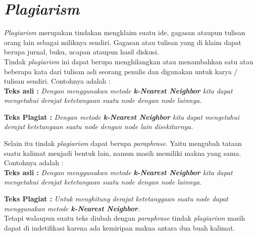 \documentclass[../Proposal.tex]{subfiles}
\begin{document}
	\section{\textit{Plagiarism}}
	\textit{Plagiarism} merupakan tindakan mengklaim suatu ide, gagasan ataupun tulisan orang lain sebagai miliknya sendiri. Gagasan atau tulisan yang di klaim dapat berupa jurnal, buku, ucapan ataupun hasil diskusi. \\
	
	\noindent Tindak \textit{plagiarism} ini dapat berupa menghilangkan atau menambahkan satu atau beberapa kata dari tulisan asli seorang penulis dan digunakan untuk karya / tulisan sendiri\cite{rule-plagiat}. Contohnya adalah : \\
	
	\indent \textbf{Teks asli : } \textit{Dengan menggunakan metode \textbf{\textit{k-Nearest Neighbor}} kita dapat mengetahui derajat ketetangaan suatu \textit{node} dengan \textit{node} lainnya.}
	
	\indent \textbf{Teks Plagiat : } \textit{Dengan metode \textbf{\textit{k-Nearest Neighbor}} kita dapat mengetahui derajat ketetangaan suatu \textit{node} dengan \textit{node} lain disekitarnya. \\}
	
	Selain itu tindak \textit{plagiarism} dapat berupa \textit{paraphrase}. Yaitu mengubah tataan suatu kalimat menjadi bentuk lain, namun masih memiliki makna yang sama. Contohnya adalah : \\
	
	\indent \textbf{Teks asli : } \textit{Dengan menggunakan metode \textbf{\textit{k-Nearest Neighbor}} kita dapat mengetahui derajat ketetangaan suatu \textit{node} dengan \textit{node} lainnya.}
	
	\indent \textbf{Teks Plagiat : } \textit{Untuk menghitung derajat ketetanggaan suatu \textit{node} dapat menggunakan metode \textbf{\textit{k-Nearest Neighbor}}.} \\
	
	\noindent Tetapi walaupun suatu teks diubah dengan \textit{paraphrase} tindak \textit{plagiarism} masih dapat di indetifikasi karena ada kemiripan makna antara dua buah kalimat.
\end{document}
